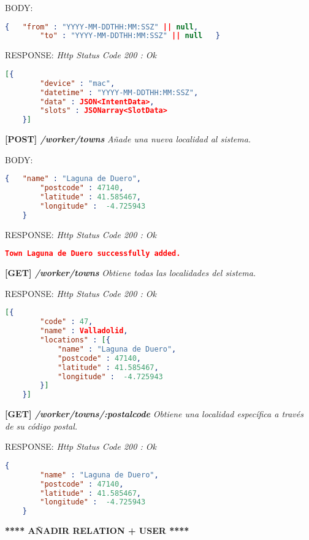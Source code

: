     BODY:
   \begin{lstlisting}[language=json,firstnumber=1]
    {   "from" : "YYYY-MM-DDTHH:MM:SSZ" || null,
        "to" : "YYYY-MM-DDTHH:MM:SSZ" || null   }
    \end{lstlisting} 
    
    RESPONSE: \newline
    \textit{Http Status Code 200 : Ok}
    \begin{lstlisting}[language=json,firstnumber=1]
    [{
        "device" : "mac",
        "datetime" : "YYYY-MM-DDTHH:MM:SSZ",
        "data" : JSON<IntentData>,
        "slots" : JSONarray<SlotData>
    }]
    \end{lstlisting}
\hline \newline

\textbf{[POST] \textit{/worker/towns }}
\textit{Añade una nueva localidad al sistema.}

    BODY:
   \begin{lstlisting}[language=json,firstnumber=1]
    {   "name" : "Laguna de Duero",
        "postcode" : 47140,
        "latitude" : 41.585467,
        "longitude" :  -4.725943
    }
    \end{lstlisting} 
    
    RESPONSE: \newline
    \textit{Http Status Code 200 : Ok}
    \begin{lstlisting}[language=json,firstnumber=1]
    Town Laguna de Duero successfully added.
    \end{lstlisting}
\hline \newline

\textbf{[GET] \textit{/worker/towns }}
\textit{Obtiene todas las localidades del sistema.}
    
    RESPONSE: \newline
    \textit{Http Status Code 200 : Ok}
    \begin{lstlisting}[language=json,firstnumber=1]
    [{
        "code" : 47,
        "name" : Valladolid,
        "locations" : [{
            "name" : "Laguna de Duero",
            "postcode" : 47140,
            "latitude" : 41.585467,
            "longitude" :  -4.725943
        }]
    }]
    \end{lstlisting}
\hline

\textbf{[GET] \textit{/worker/towns/:postalcode }}
\textit{Obtiene una localidad específica a través de su código postal.}
    
    RESPONSE: \newline
    \textit{Http Status Code 200 : Ok}
    \begin{lstlisting}[language=json,firstnumber=1]
    {
        "name" : "Laguna de Duero",
        "postcode" : 47140,
        "latitude" : 41.585467,
        "longitude" :  -4.725943
    }
    \end{lstlisting}
\hline

\textbf{**** AÑADIR RELATION + USER ****}